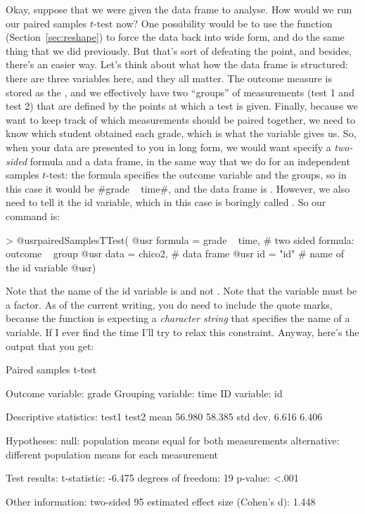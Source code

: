 Okay, suppose that we were given the  data frame to analyse. How would we run our paired samples $t$-test now? One possibility would be to use the  function (Section~\ref{sec:reshape}) to force the data back into wide form, and do the same thing that we did previously. But that's sort of defeating the point, and besides, there's an easier way. Let's think about what how the  data frame is structured: there are three variables here, and they all matter. The outcome measure is stored as the , and we effectively have two ``groups'' of measurements (test 1 and test 2) that are defined by the  points at which a test is given. Finally, because we want to keep track of which measurements should be paired together, we need to know which student obtained each grade, which is what the  variable gives us. So, when your data are presented to you in long form, we would want specify a {\it two-sided} formula and a data frame, in the same way that we do for an independent samples $t$-test: the formula specifies the outcome variable and the groups, so in this case it would be \rtextverb#grade ~ time#, and the data frame is . However, we also need to tell it the id variable, which in this case is boringly called . So our command is:
\begin{rblock1}
> @usr{pairedSamplesTTest(} 
  @usr{   formula = grade ~ time,}  # two sided formula: outcome ~ group
  @usr{   data = chico2,}           # data frame
  @usr{   id = "id" }               # name of the id variable
  @usr{)}
\end{rblock1}
Note that the name of the id variable is  and not . Note that the  variable must be a factor. As of the current writing, you do need to include the quote marks, because the  function is expecting a {\it character string} that specifies the name of a variable. If I ever find the time I'll try to relax this constraint. Anyway, here's the output that you get:
\begin{rblock1}
   Paired samples t-test 

Outcome variable:   grade 
Grouping variable:  time 
ID variable:        id 

Descriptive statistics: 
             test1  test2
   mean     56.980 58.385
   std dev.  6.616  6.406

Hypotheses: 
   null:        population means equal for both measurements
   alternative: different population means for each measurement

Test results: 
   t-statistic:  -6.475 
   degrees of freedom:  19 
   p-value:  <.001 

Other information: 
   two-sided 95%
   estimated effect size (Cohen's d):  1.448 
\end{rblock1}
